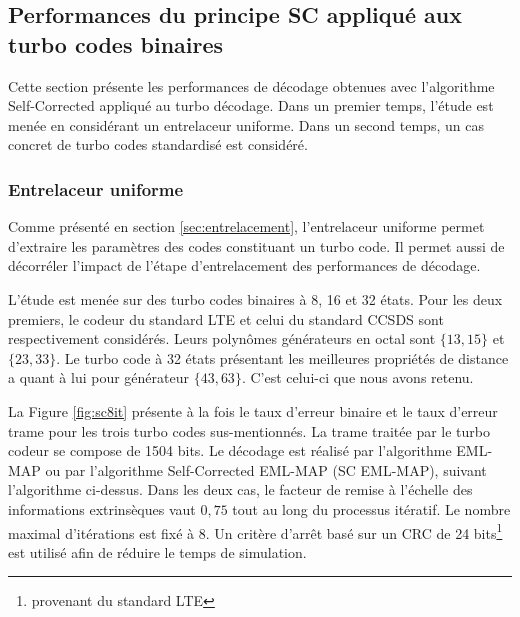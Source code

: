 \subsection{Performances du principe SC appliqué aux turbo codes binaires}
Cette section présente les performances de décodage obtenues avec l'algorithme Self-Corrected appliqué au turbo décodage. Dans un premier temps, 
l'étude est menée en considérant un entrelaceur uniforme. Dans un second temps, un cas concret de turbo codes standardisé est considéré.
\subsubsection{Entrelaceur uniforme}
Comme présenté en section \ref{sec:entrelacement}, l'entrelaceur uniforme permet d'extraire les paramètres des codes 
constituant un turbo code. Il permet aussi de décorréler l'impact de l'étape d'entrelacement des performances de 
décodage. 

L'étude est menée sur des turbo codes binaires à 8, 16 et 32 états. Pour les deux premiers, le codeur du standard LTE
et celui du standard CCSDS sont respectivement considérés. Leurs polynômes générateurs en octal sont $\{13,15\}$ et $\{23,33\}$. Le 
turbo code à 32 états présentant les meilleures propriétés de distance a quant à lui pour générateur $\{43,63\}$. C'est 
celui-ci que nous avons retenu.

La Figure \ref{fig:sc8it} présente à la fois le taux d'erreur binaire et le taux d'erreur trame pour les trois turbo 
codes sus-mentionnés. La trame traitée par le turbo codeur se compose de 1504 bits. Le décodage est réalisé par
l'algorithme EML-MAP ou par l’algorithme Self-Corrected EML-MAP (SC EML-MAP), suivant l'algorithme ci-dessus.
Dans les deux cas, le facteur de remise à l'échelle des informations extrinsèques vaut $0,75$ tout au long du processus itératif.
Le nombre maximal d'itérations est fixé à 8. Un critère d'arrêt basé sur un CRC de 24 bits\footnote{provenant du standard LTE} est utilisé afin de réduire le
temps de simulation.

